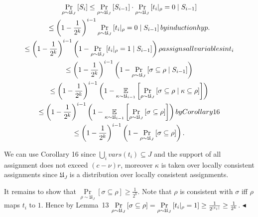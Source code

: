 \[\begin{gathered}
\displaystyle\Pr\limits_{\rho\sim\mathfrak{U}_{J}}\left[S_{i}\right] \displaystyle\leq\Pr\limits_{\rho\sim\mathfrak{U}_{J}}\left[S_{i-1}\right]%
\cdot\Pr\limits_{\rho\sim\mathfrak{U}_{J}}\left[t_{i}|_{\rho}=0\mid S_{i-1}\right] \\
\displaystyle\leq\left(1-\frac{1}{2^{k}}\right)^{i-1}\Pr\limits_{\rho\sim%
\mathfrak{U}_{J}}\left[t_{i}|_{\rho}=0\mid S_{i-1}\right] by
induction
hyp. \\
\displaystyle\leq\left(1-\frac{1}{2^{k}}\right)^{i-1}\left(1-\Pr\limits_{\rho%
\sim\mathfrak{U}_{J}}\left[t_{i}|_{\rho}=1\mid S_{i-1}\right]\right) \rho assigns all variables in t_{i} \\
\displaystyle\leq\left(1-\frac{1}{2^{k}}\right)^{i-1}\left(1-\Pr\limits_{\rho%
\sim\mathfrak{U}_{J}}\left[\sigma\subseteq\rho\mid S_{i-1}\right]\right) \\
\displaystyle\leq\left(1-\frac{1}{2^{k}}\right)^{i-1}\left(1-\operatorname*{%
\mathbb{E}}\limits_{\kappa\sim\mathfrak{U}_{i-1}}\left[\Pr\limits_{\rho\sim%
\mathfrak{U}_{J}}\left[\sigma\subseteq\rho\mid\kappa\subseteq\rho\right]\right%
]\right) \\
\displaystyle\leq\left(1-\frac{1}{2^{k}}\right)^{i-1}\left(1-\operatorname*{%
\mathbb{E}}\limits_{\kappa\sim\mathfrak{U}_{i-1}}\left[\Pr\limits_{\rho\sim%
\mathfrak{U}_{J}}\left[\sigma\subseteq\rho\right]\right]\right) by
Corollary
16 \\
\displaystyle\leq\left(1-\frac{1}{2^{k}}\right)^{i-1}\left(1-\Pr\limits_{\rho%
\sim\mathfrak{U}_{J}}\left[\sigma\subseteq\rho\right]\right).
\end{gathered}\]




We can use Corollary 16 since $\bigcup\limits_{i}\textit{vars}(t_{i})\subseteq J$
and the support of all assignment does not exceed $(c-\nu)r$, moreover $\kappa$ is taken over
locally consistent assignments since $\mathfrak{U}_{J}$ is a distribution over locally consistent
assignments.\par




It remains to show that $\Pr\limits_{\rho\sim\mathfrak{U}_{J}}\left[\sigma\subseteq\rho\right]\geq\frac%
{1}{2^{k}}$. Note that $\rho$ is consistent with $\sigma$ iff $\rho$ maps $t_{i}$ to
$1$. Hence by Lemma 13
$\Pr\limits_{\rho\sim\mathfrak{U}_{J}}\left[\sigma\subseteq\rho\right]=\Pr%
\limits_{\rho\sim\mathfrak{U}_{J}}\left[t_{i}|_{\rho}=1\right]\geq\frac{1}{2^{%
|t_{i}|}}\geq\frac{1}{2^{k}}$.
$\blacktriangleleft$\par






